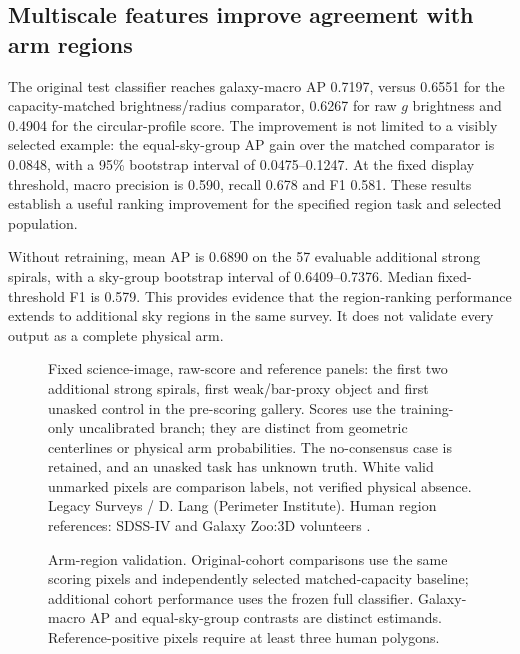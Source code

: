 \documentclass[11pt]{article}
\begin{document}
\subsection{Multiscale features improve agreement with arm regions}
The original test classifier reaches galaxy-macro AP 0.7197, versus 0.6551
for the capacity-matched brightness/radius comparator, 0.6267 for raw $g$
brightness and 0.4904 for the circular-profile score. The improvement is not
limited to a visibly selected example: the equal-sky-group AP gain over the
matched comparator is 0.0848, with a 95\% bootstrap interval of
0.0475--0.1247. At the fixed display threshold, macro precision is 0.590,
recall 0.678 and F1 0.581. These results establish a useful ranking improvement
for the specified region task and selected population.

Without retraining, mean AP is 0.6890 on the 57 evaluable additional strong
spirals, with a sky-group bootstrap interval of 0.6409--0.7376. Median
fixed-threshold F1 is 0.579. This provides evidence that the region-ranking
performance extends to additional sky regions in the same survey. It does
not validate every output as a complete physical arm.

\begin{figure}[p]
\centering{}
\caption{Fixed science-image, raw-score and reference panels: the first two
additional strong spirals, first weak/bar-proxy object and first unasked control
in the pre-scoring gallery. Scores use the training-only uncalibrated branch;
they are distinct from geometric centerlines or physical arm probabilities.
The no-consensus case is retained, and an unasked task has unknown truth.
White valid unmarked pixels are comparison labels, not verified physical absence.
Legacy Surveys / D. Lang (Perimeter Institute). Human region references:
SDSS-IV and Galaxy Zoo:3D volunteers \citep{masters2021}.}
\label{fig:examples}
\end{figure}
\begin{figure}[htbp]
\centering{}
\caption{Arm-region validation. Original-cohort comparisons use the same
scoring pixels and independently selected matched-capacity baseline; additional
cohort performance uses the frozen full classifier. Galaxy-macro AP and
equal-sky-group contrasts are distinct estimands. Reference-positive pixels
require at least three human polygons.}
\label{fig:ap}
\end{figure}

\FloatBarrier
\end{document}

